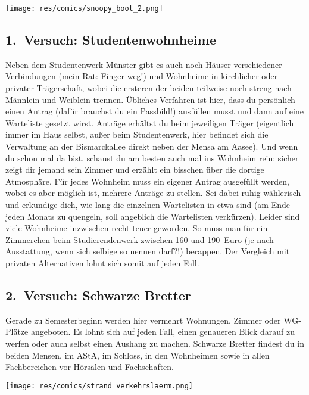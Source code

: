 \begin{multicols*}{2}
\begin{center}
\texttt{[image: res/comics/snoopy\_boot\_2.png]}
\end{center}

\subsection*{1.\ Versuch: Studentenwohnheime}
Neben dem Studentenwerk Münster gibt es auch noch Häuser verschiedener Verbindungen (mein Rat: Finger weg!) und Wohnheime in kirchlicher oder privater Trägerschaft, wobei die ersteren der beiden teilweise noch streng nach Männlein und Weiblein trennen. Übliches Verfahren ist hier, dass du persönlich einen Antrag (dafür brauchst du ein Passbild!) ausfüllen musst und dann auf eine Warteliste gesetzt wirst. Anträge erhältst du beim jeweiligen Träger (eigentlich immer im Haus selbst, außer beim Studentenwerk, hier befindet sich die Verwaltung an der Bismarckallee direkt neben der Mensa am Aasee). Und wenn du schon mal da bist, schaust du am besten auch mal ins Wohnheim rein; sicher zeigt dir jemand sein Zimmer und erzählt ein bisschen über die dortige Atmosphäre. Für jedes Wohnheim muss ein eigener Antrag ausgefüllt werden, wobei es aber möglich ist, mehrere Anträge zu stellen. Sei dabei ruhig wählerisch und erkundige dich, wie lang die einzelnen Wartelisten in etwa sind (am Ende jeden Monats zu quengeln, soll angeblich die Wartelisten verkürzen). Leider sind viele Wohnheime inzwischen recht teuer geworden. So muss man für ein Zimmerchen beim Studierendenwerk zwischen 160 und 190~Euro (je nach Ausstattung, wenn sich selbige so nennen darf?!) berappen. Der Vergleich mit privaten Alternativen lohnt sich somit auf jeden Fall.

\subsection*{2.\ Versuch: Schwarze Bretter}
Gerade zu Semesterbeginn werden hier vermehrt Wohnungen, Zimmer oder WG-Plätze angeboten. Es lohnt sich auf jeden Fall, einen genaueren Blick darauf zu werfen oder auch selbst einen Aushang zu machen. Schwarze Bretter findest du in beiden Mensen, im AStA, im Schloss, in den Wohnheimen sowie in allen Fachbereichen vor Hörsälen und Fachschaften.
\vspace{-1em}
\begin{center}
\texttt{[image: res/comics/strand\_verkehrslaerm.png]}
\end{center}
\vspace{-2em}

\end{multicols*}

